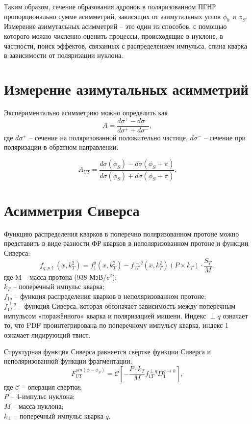 \documentclass{extreport}
\begin{document}
Таким образом, сечение образования адронов в поляризованном ПГНР пропорционально сумме асимметрий, зависящих от азимутальных углов $\phi_h$ и $\phi_S$. Измерение азимутальных асимметрий -- это один из способов, с помощью которого можно численно оценить процессы, происходящие в нуклоне, в частности, поиск эффектов, связанных с распределением импульса, спина кварка в зависимости от поляризации нуклона.
\section{Измерение азимутальных асимметрий}



Экспериментально асимметрию можно определить как 
\begin{equation}
	A = \frac{d\sigma^{+}-d\sigma^{-}}{d\sigma^{+}+d\sigma^{-}},
\end{equation}
где $d\sigma^{+}$ -- сечение на поляризованной положительно частице, $d\sigma^{-}$ -- сечение при поляризации в обратном направлении.


\begin{equation}
	A_{UT} = \frac{d\sigma(\phi_S)-d\sigma(\phi_S+\pi)}{d\sigma(\phi_S)+d\sigma(\phi_S+\pi)}.
\end{equation}
\section{Асимметрия Сиверса}
Функцию распределения кварков в поперечно поляризованном протоне можно представить в виде разности ФР кварков в неполяризованном протоне и функции Сиверса:
\begin{equation}
	\label{eq:Sivers}
	f_{q,p\uparrow} (x,k^2_T )=f_1^q (x,k^2_T )-f_{1T}^{\perp q} (x,k^2_T )(P\times k_T ) \cdot \frac{S_T}{M},
\end{equation}
где M – масса протона (938 МэВ/$c^2$); \\ $k_T$ – поперечный импульс кварка; \\ $f_{1q}$ – функция распределения кварков в неполяризованном протоне; \\ $f_{1T}^{\perp q}$ – функция Сиверса, которая обозначает зависимость между поперечным импульсом «поражённого» кварка и поляризацией мишени. Индекс $\perp q$ означает то, что PDF проинтегрирована по поперечному импульсу кварка, индекс 1 означает лидирующий твист.

Структурная функция Сиверса равняется свёртке функции Сиверса и неполяризованной функции фрагментации:
\begin{equation}
	\label{eq:Fsiv}
	F^{sin(\phi-\phi_S)}_{UT} = \mathcal{C}\left [-\frac{P\cdot k_T}{M}f_{1T}^{\perp q}D_1^{q \rightarrow h} \right],
\end{equation}
где $\mathcal{C}$ -- операция свёртки; \\ $P$ -- 4-импульс нуклона; \\ $M$ -- масса нуклона; \\ $k_{\perp}$ -- поперечный импульс кварка $q$. 
\end{document}
